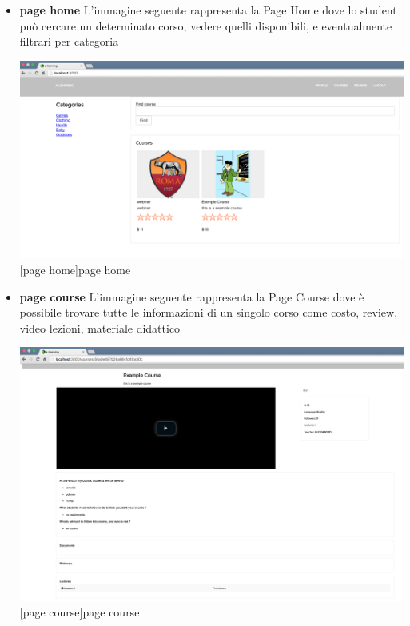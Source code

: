 \begin{itemize}

\item \textbf{page home} L'immagine seguente rappresenta la Page Home dove lo student può cercare un determinato corso, vedere quelli disponibili, e eventualmente filtrari per categoria\par

\begin{minipage}{\linewidth}
    \centering
    \includegraphics[width=1.0\linewidth]{images/chapter4/page-home.png}
    [page home]{page home}
\end{minipage}


\item \textbf{page course} L'immagine seguente rappresenta la Page Course dove è possibile trovare tutte le informazioni di un singolo corso come costo, review, video lezioni, materiale didattico \par
\begin{minipage}{\linewidth}
    \centering
    \includegraphics[width=1.0\linewidth]{images/chapter4/page-course.png}
    [page course]{page course}
\end{minipage}



\end{itemize}

